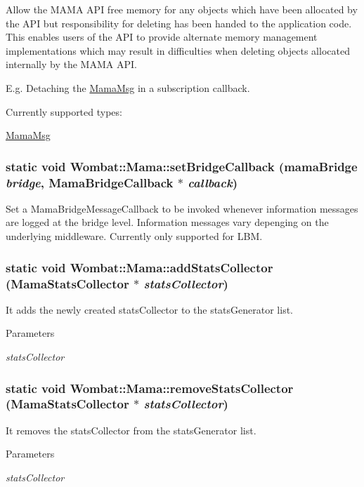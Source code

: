 Allow the MAMA API free memory for any objects which have been allocated by the API but responsibility for deleting has been handed to the application code. This enables users of the API to provide alternate memory management implementations which may result in difficulties when deleting objects allocated internally by the MAMA API.

E.g. Detaching the \hyperlink{classWombat_1_1MamaMsg}{MamaMsg} in a subscription callback.

Currently supported types:

\hyperlink{classWombat_1_1MamaMsg}{MamaMsg} \hypertarget{classWombat_1_1Mama_ae483353a450b19b32b5b52d49e870d3c}{
\subsubsection[{setBridgeCallback}]{\setlength{\rightskip}{0pt plus 5cm}static void Wombat::Mama::setBridgeCallback (mamaBridge {\em bridge}, \/  {\bf MamaBridgeCallback} $\ast$ {\em callback})}}
\label{classWombat_1_1Mama_ae483353a450b19b32b5b52d49e870d3c}


Set a MamaBridgeMessageCallback to be invoked whenever information messages are logged at the bridge level. Information messages vary depenging on the underlying middleware. Currently only supported for LBM. \hypertarget{classWombat_1_1Mama_a0a49c8fa5e9b8af6378793d51be6d433}{
\subsubsection[{addStatsCollector}]{\setlength{\rightskip}{0pt plus 5cm}static void Wombat::Mama::addStatsCollector ({\bf MamaStatsCollector} $\ast$ {\em statsCollector})}}
\label{classWombat_1_1Mama_a0a49c8fa5e9b8af6378793d51be6d433}


It adds the newly created statsCollector to the statsGenerator list. 
\begin{DoxyParams}{Parameters}
\item[{\em statsCollector}]\end{DoxyParams}
\hypertarget{classWombat_1_1Mama_a146a3b3e2ee2490164a2b7659cbb712c}{
\subsubsection[{removeStatsCollector}]{\setlength{\rightskip}{0pt plus 5cm}static void Wombat::Mama::removeStatsCollector ({\bf MamaStatsCollector} $\ast$ {\em statsCollector})}}
\label{classWombat_1_1Mama_a146a3b3e2ee2490164a2b7659cbb712c}


It removes the statsCollector from the statsGenerator list. 
\begin{DoxyParams}{Parameters}
\item[{\em statsCollector}]\end{DoxyParams}

